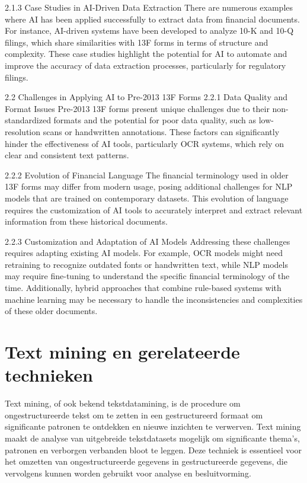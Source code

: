 2.1.3 Case Studies in AI-Driven Data Extraction
There are numerous examples where AI has been applied successfully to extract data from financial documents. For instance, AI-driven systems have been developed to analyze 10-K and 10-Q filings, which share similarities with 13F forms in terms of structure and complexity. These case studies highlight the potential for AI to automate and improve the accuracy of data extraction processes, particularly for regulatory filings.

2.2 Challenges in Applying AI to Pre-2013 13F Forms
2.2.1 Data Quality and Format Issues
Pre-2013 13F forms present unique challenges due to their non-standardized formats and the potential for poor data quality, such as low-resolution scans or handwritten annotations. These factors can significantly hinder the effectiveness of AI tools, particularly OCR systems, which rely on clear and consistent text patterns.

2.2.2 Evolution of Financial Language
The financial terminology used in older 13F forms may differ from modern usage, posing additional challenges for NLP models that are trained on contemporary datasets. This evolution of language requires the customization of AI tools to accurately interpret and extract relevant information from these historical documents.

2.2.3 Customization and Adaptation of AI Models
Addressing these challenges requires adapting existing AI models. For example, OCR models might need retraining to recognize outdated fonts or handwritten text, while NLP models may require fine-tuning to understand the specific financial terminology of the time. Additionally, hybrid approaches that combine rule-based systems with machine learning may be necessary to handle the inconsistencies and complexities of these older documents.

\section{Text mining en gerelateerde technieken}
Text mining, of ook bekend tekstdatamining, is de procedure om ongestructureerde tekst om te zetten in een gestructureerd formaat om significante patronen te ontdekken en nieuwe inzichten te verwerven. Text mining maakt de analyse van uitgebreide tekstdatasets mogelijk om significante thema's, patronen en verborgen verbanden bloot te leggen. Deze techniek is essentieel voor het omzetten van ongestructureerde gegevens in gestructureerde gegevens, die vervolgens kunnen worden gebruikt voor analyse en besluitvorming\autocite{IBM2024}.

